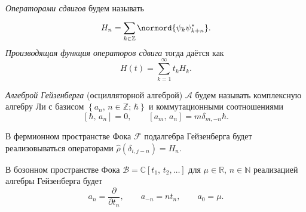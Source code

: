 \documentclass[a4paper,14pt]{extarticle}
\numberwithin{equation}{section}
\begin{document}

\begin{dfn*}
	\emph{Операторами сдвигов} будем называть
\begin{equation}
	H_n= \sum_{k \in \mathbb{Z}}^{} \normord{\psi_k \psi_{k+n}^{*}}
.\end{equation}
\emph{Производящая функция операторов сдвига} тогда даётся как
\begin{equation}
	 H(t)= \sum_{k=1}^{\infty} t_k H_k
.\end{equation}
\end{dfn*}
\begin{dfn*}
	\emph{Алгеброй Гейзенберга} (осцилляторной алгеброй) $\mathcal{A}$  будем называть комплексную алгебру Ли с базисом $\left\{ a_n,\,n\in \mathbb{Z};\, \hbar  \right\} $ и коммутационными соотношениями
	\[
	\left[ \hbar ,\,a_n \right] =0,\qquad \left[ a_m,\,a_n \right] = m \delta_{m,-n}\hbar 
	.\] 
\end{dfn*}

\begin{stm*}
	В фермионном пространстве Фока $\mathcal{F}$ подалгебра Гейзенберга будет реализовываться операторами $\hat{\rho}\left( \delta_{i,j-n} \right) =H_n$.
\end{stm*}
\begin{stm*}
	В бозонном пространстве Фока $\mathcal{B}=\mathbb{C}\left[ t_1,\,t_2,\ldots \right] $ для $\mu  \in \mathbb{R}$, $n \in \mathbb{N}$ реализацией алгебры Гейзенберга будет
	\[
	a_n= \frac{\partial }{\partial t_n} ,\qquad a_{-n}=
	n  t_{n},\qquad a_0=\mu
	.\] 
\end{stm*}
\end{document}
